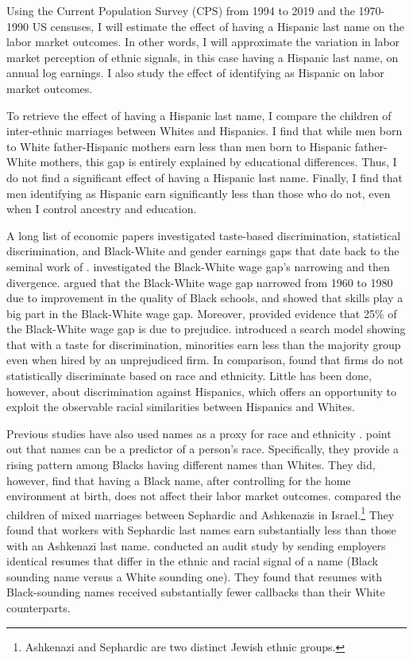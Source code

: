 \documentclass[12pt, fullpage]{article}
\begin{document}
Using the Current Population Survey (CPS) from 1994 to 2019 and the 1970-1990 US censuses, I will estimate the effect of having a Hispanic last name on the labor market outcomes. In other words, I will approximate the variation in labor market perception of ethnic signals, in this case having a Hispanic last name, on annual log earnings. I also study the effect of identifying as Hispanic on labor market outcomes. 

To retrieve the effect of having a Hispanic last name, I compare the children of inter-ethnic marriages between Whites and Hispanics. I find that while men born to White father-Hispanic mothers earn less than men born to Hispanic father-White mothers, this gap is entirely explained by educational differences. Thus, I do not find a significant effect of having a Hispanic last name. Finally, I find that men identifying as Hispanic earn significantly less than those who do not, even when I control ancestry and education. 

A long list of economic papers investigated taste-based discrimination, statistical discrimination, and Black-White and gender earnings gaps that date back to the seminal work of \citet{becker2010economics}. \citet{bayer2018divergent} investigated the Black-White wage gap's narrowing and then divergence. \citet{card1992school} argued that the Black-White wage gap narrowed from 1960 to 1980 due to improvement in the quality of Black schools, and \citet{juhn1991accounting} showed that skills play a big part in the Black-White wage gap. Moreover,  \citet{charles2008prejudice} provided evidence that 25\% of the Black-White wage gap is due to prejudice. \citet{black1995discrimination} introduced a search model showing that with a taste for discrimination, minorities earn less than the majority group even when hired by an unprejudiced firm. In comparison, \citet{altonji2001employer} found that firms do not statistically discriminate based on race and ethnicity. Little has been done, however, about discrimination against Hispanics, which offers an opportunity to exploit the observable racial similarities between Hispanics and Whites.

Previous studies have also used names as a proxy for race and ethnicity \citep{fryer2004causes, rubinstein2014pride, bertrand2004emily}. \citet{fryer2004causes} point out that names can be a predictor of a person's race. Specifically, they provide a rising pattern among Blacks having different names than Whites. They did, however, find that having a Black name, after controlling for the home environment at birth, does not affect their labor market outcomes. \citet{rubinstein2014pride} compared the children of mixed marriages between Sephardic and Ashkenazis in Israel.\footnote{Ashkenazi and Sephardic are two distinct Jewish ethnic groups.} They found that workers with Sephardic last names earn substantially less than those with an Ashkenazi last name. \citet{bertrand2004emily} conducted an audit study by sending employers identical resumes that differ in the ethnic and racial signal of a name (Black sounding name versus a White sounding one). They found that resumes with Black-sounding names received substantially fewer callbacks than their White counterparts. 
\end{document}
